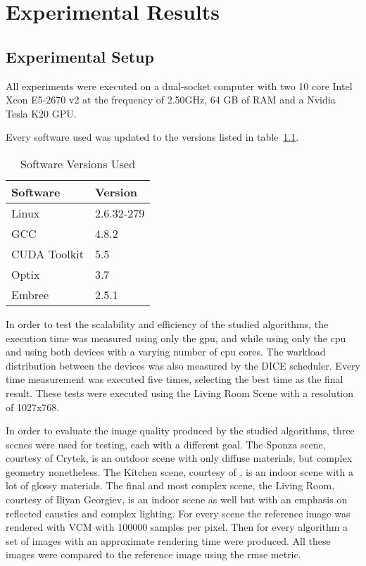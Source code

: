 \chapter{Experimental Results}

\section{Experimental Setup}

All experiments were executed on a dual-socket computer with two 10 core Intel Xeon E5-2670 v2 at the frequency of 2.50GHz, 64 GB of RAM and a Nvidia Tesla K20 GPU.

Every software used was updated to the versions listed in table~\ref{tab:soft_ver}.

\begin{table}[h]
\centering
\begin{tabular}{|l|l|}

\hline
Software & Version \\
\hline
Linux & 2.6.32-279 \\
\hline
GCC & 4.8.2 \\
\hline
CUDA Toolkit & 5.5 \\
\hline
Optix & 3.7 \\
\hline
Embree & 2.5.1 \\
\hline

\end{tabular}
\caption{\label{tab:soft_ver} Software Versions Used}
\end{table}

In order to test the scalability and efficiency of the studied algorithms, the execution time was measured using only the \gls{gpu}, and while using only the \gls{cpu} and using both devices with a varying number of \gls{cpu} cores. The warkload distribution between the devices was also measured by the DICE scheduler. Every time measurement was executed five times, selecting the best time as the final result. These tests were executed using the Living Room Scene with a resolution of 1027x768.

In order to evaluate the image quality produced by the studied algorithms, three scenes were used for testing, each with a different goal. The Sponza scene, courtesy of Crytek, is an outdoor scene with only diffuse materials, but complex geometry nonetheless. The Kitchen scene, courtesy of , is an indoor scene with a lot of glossy materials. The final and most complex scene, the Living Room, courtesy of Iliyan Georgiev, is an indoor scene as well but with an emphasis on reflected caustics and complex lighting. For every scene the reference image was rendered with VCM with 100000 samples per pixel. Then for every algorithm a set of images with an approximate rendering time were produced. All these images were compared to the reference image using the \gls{rmse} metric.



